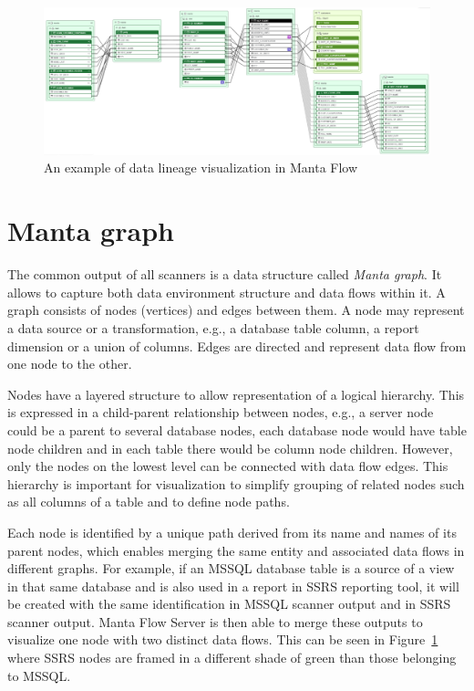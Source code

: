 \begin{figure}[ht]\centering
\includegraphics[width=1.0\textwidth]{img/lineage_example.PNG}
\caption{An example of data lineage visualization in Manta Flow}
\label{fig01:lineage}
\end{figure}  

\section{Manta graph}

The common output of all scanners is a data structure called \textit{Manta graph}. It allows to capture both data environment structure and data flows within it. A graph consists of nodes (vertices) and edges between them. A node may represent a data source or a transformation, e.g., a database table column, a report dimension or a union of columns. Edges are directed and represent data flow from one node to the other.
\par
Nodes have a layered structure to allow representation of a logical hierarchy. This is expressed in a child-parent relationship between nodes, e.g., a server node could be a parent to several database nodes, each database node would have table node children and in each table there would be column node children. However, only the nodes on the lowest level can be connected with data flow edges. This hierarchy is important for visualization to simplify grouping of related nodes such as all columns of a table and to define node paths.
\par
Each node is identified by a unique path derived from its name and names of its parent nodes, which enables merging the same entity and associated data flows in different graphs. For example, if an MSSQL database table is a source of a view in that same database and is also used in a report in SSRS reporting tool, it will be created with the same identification in MSSQL scanner output and in SSRS scanner output. Manta Flow Server is then able to merge these outputs to visualize one node with two distinct data flows. This can be seen in Figure~\ref{fig01:lineage} where SSRS nodes are framed in a different shade of green than those belonging to MSSQL.

